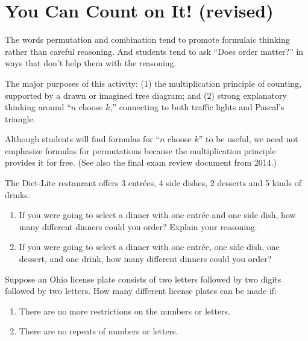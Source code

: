 \newpage
\section{You Can Count on It! (revised)}\label{A:countOnIt}
\begin{teachingnote}
 The words permutation and combination tend to promote formulaic thinking rather than careful reasoning.  And students tend to ask ``Does order matter?'' in ways that don't help them with the reasoning. 

The major purposes of this activity: (1) the multiplication principle of counting, supported by a drawn or imagined tree diagram; and (2) strong explanatory thinking around ``$n$ choose $k$,'' connecting to both traffic lights and Pascal's triangle.  

Although students will find formulas for ``$n$ choose $k$'' to be useful, we need not emphasize formulas for permutations because the multiplication principle provides it for free.   (See also the final exam review document from 2014.)
\end{teachingnote}

\begin{prob}
The Diet-Lite restaurant offers 3 entr\'ees, 4 side dishes, 2 desserts
and 5 kinds of drinks.  
\begin{enumerate}
\item If you were going to select a dinner with one
entr\'ee and one side dish, how many different dinners could you order?  Explain your reasoning.  
\item If you were going to select a dinner with one
entr\'ee, one side dish, one dessert, and one drink, how many different
dinners could you order?
\end{enumerate}
\end{prob}

\begin{prob}
Suppose an Ohio license plate consists of two letters followed by two
digits followed by two letters.  How many different
license plates can be made if: 
\begin{enumerate}
\item There are no more restrictions on the
numbers or letters.
\item  There are no repeats of numbers or letters.
\end{enumerate}
\end{prob}

